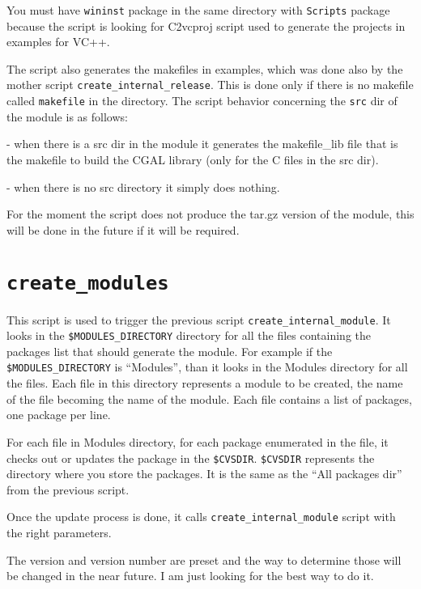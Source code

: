 You must have {\tt wininst} package in the same directory with {\tt Scripts} package because the script is looking for C2vcproj script used to generate the projects in examples for VC++.

The script also generates the makefiles in examples, which was done also by the mother script {\tt create\_internal\_release}. This is done only if there is no makefile called {\tt makefile} in the directory. 
The script behavior concerning the {\tt src} dir of the module is as follows: 

  - when there is a src dir in the module it generates the makefile\_lib file that is the makefile to build the CGAL library (only for the C files in the src dir).     

  - when there is no src directory it simply does nothing.

For the moment the script does not produce the tar.gz version of the module, this will be done in the future if it will be required.
  


\section{{\tt create\_modules}}
\label{sec:create_modules}

This script is used to trigger the previous script {\tt create\_internal\_module}. It looks in the {\tt \$MODULES\_DIRECTORY} directory for all the files containing the packages list that should generate the module. For example if the {\tt \$MODULES\_DIRECTORY} is ``Modules'', than it looks in the Modules directory for all the files. Each file in this directory represents a module to be created, the name of the file becoming the name of the module. Each file contains a list of packages, one package per line.

For each file in Modules directory, for each package enumerated in the file, it checks out or updates the package in the {\tt \$CVSDIR}. {\tt \$CVSDIR} represents the directory where you store the packages. It is the same as the ``All packages dir'' from the previous script.

Once the update process is done, it calls {\tt create\_internal\_module} script with the right parameters.

The version and version number are preset and the way to determine those will be changed in the near future. I am just looking for the best way to do it. 
  


